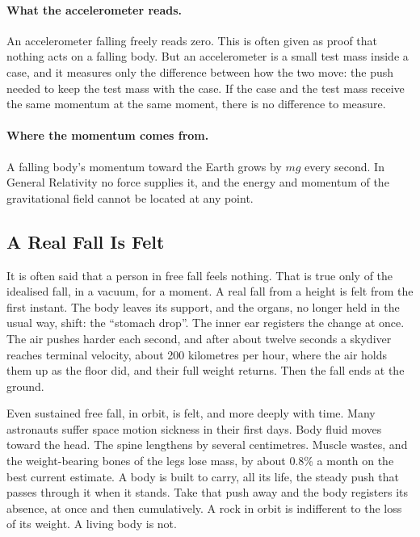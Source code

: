 \documentclass[11pt,a4paper]{article}
\begin{document}
\paragraph{What the accelerometer reads.} An accelerometer falling freely reads zero. This is often given as proof that nothing acts on a falling body. But an accelerometer is a small test mass inside a case, and it measures only the difference between how the two move: the push needed to keep the test mass with the case. If the case and the test mass receive the same momentum at the same moment, there is no difference to measure. 

\paragraph{Where the momentum comes from.} A falling body's momentum toward the Earth grows by $mg$ every second. In General Relativity no force supplies it, and the energy and momentum of the gravitational field cannot be located at any point. 

\subsection*{A Real Fall Is Felt}

It is often said that a person in free fall feels nothing. That is true only of the idealised fall, in a vacuum, for a moment. A real fall from a height is felt from the first instant. The body leaves its support, and the organs, no longer held in the usual way, shift: the ``stomach drop''. The inner ear registers the change at once. The air pushes harder each second, and after about twelve seconds a skydiver reaches terminal velocity, about 200 kilometres per hour, where the air holds them up as the floor did, and their full weight returns. Then the fall ends at the ground.

Even sustained free fall, in orbit, is felt, and more deeply with time. Many astronauts suffer space motion sickness in their first days. Body fluid moves toward the head. The spine lengthens by several centimetres. Muscle wastes, and the weight-bearing bones of the legs lose mass, by about 0.8\% a month on the best current estimate. A body is built to carry, all its life, the steady push that passes through it when it stands. Take that push away and the body registers its absence, at once and then cumulatively. A rock in orbit is indifferent to the loss of its weight. A living body is not.
\end{document}
